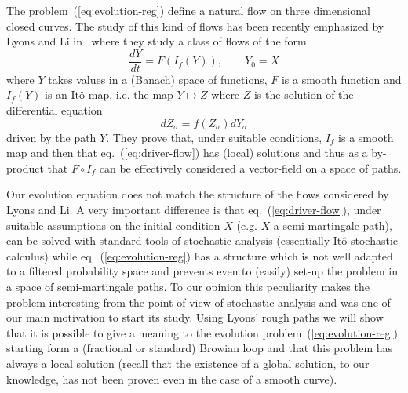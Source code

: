 \documentclass[a4paper,12pt,reqno]{amsart}
\begin{document}
The problem~(\ref{eq:evolution-reg}) define a natural flow on three
dimensional closed curves. The study of this kind of flows has been
recently emphasized by Lyons and Li in~\cite{LiLyons} where they study
a class of flows of the form
\begin{equation}
  \label{eq:driver-flow}
\frac{dY}{dt} = F(I_f(Y)), \qquad Y_0 = X  
\end{equation}
where $Y$ takes values in a (Banach) space of functions, $F$ is a
smooth function and $I_f(Y)$ is an It\^o map, i.e. the map $Y
\mapsto Z$ where $Z$ is the solution of
the differential equation
$$
dZ_\sigma = f(Z_\sigma) dY_\sigma
$$
driven by the path $Y$. They prove that, under suitable conditions,
$I_f$ is a smooth map and then that eq.~(\ref{eq:driver-flow})
has (local) solutions and thus as a by-product that $F \circ I_f$ can
be effectively considered a vector-field on a space of paths. 

Our evolution
equation does not match the structure of the flows considered by Lyons
and Li. A very important difference is that eq.~(\ref{eq:driver-flow}),
under suitable assumptions on the initial condition $X$ (e.g.  $X$ a
semi-martingale path), can be solved with standard tools of
stochastic analysis (essentially It\^o stochastic calculus) while
eq.~(\ref{eq:evolution-reg}) has a structure which is not well adapted
to a filtered probability space and prevents even to (easily) set-up
the problem in a space of semi-martingale paths. To our opinion this
peculiarity makes the problem interesting from the point of view of
stochastic analysis and was one of our main motivation to start its
study. 
Using Lyons' rough paths we will show that it is possible to give a
meaning to the evolution problem~(\ref{eq:evolution-reg}) starting form a (fractional or
standard) Browian loop and that this problem has always a local
solution (recall that the existence of a global solution, to our
knowledge, has not been proven even in the case of a smooth curve). 
\end{document}
